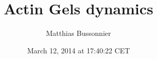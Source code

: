 \documentclass[A4paperpaper,11pt,english]{sphinxmanual}
\title{Actin Gels dynamics}
\date{March 12, 2014 at 17:40:22 CET}
\author{Matthias Bussonnier}
\begin{document}
\maketitle

\tableofcontents
\cleardoublepage
\pagestyle{normal}
 
\label{index-latex::doc}
\end{document}

